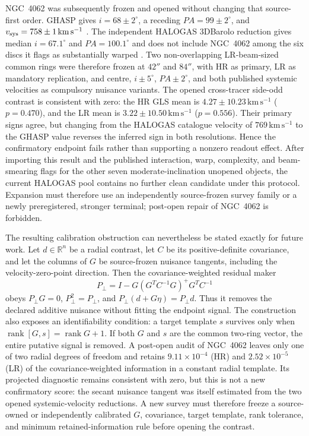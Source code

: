 \documentclass[11pt]{article}
\begin{document}
NGC~4062 was subsequently frozen and opened without changing that source-first
order. GHASP gives $i=68\pm2^\circ$, a receding
$PA=99\pm2^\circ$, and $v_{\rm sys}=758\pm1\,\mathrm{km\,s^{-1}}$
\cite{Epinat2008GHASPVI}. The independent HALOGAS 3DBarolo reduction gives
median $i=67.1^\circ$ and $PA=100.1^\circ$ and does not include NGC~4062
among the six discs it flags as substantially warped
\cite{Marasco2019HALOGASEPG}. Two non-overlapping LR-beam-sized common rings
were therefore frozen at $42''$ and $84''$, with HR as primary, LR as mandatory
replication, and centre, $i\pm5^\circ$, $PA\pm2^\circ$, and both published
systemic velocities as compulsory nuisance variants. The opened cross-tracer
side-odd contrast is consistent with zero: the HR GLS mean is
$4.27\pm10.23\,\mathrm{km\,s^{-1}}$ ($p=0.470$), and the LR mean is
$3.22\pm10.50\,\mathrm{km\,s^{-1}}$ ($p=0.556$). Their primary signs agree,
but changing from the HALOGAS catalogue velocity of $769\,\mathrm{km\,s^{-1}}$
to the GHASP value reverses the inferred sign in both resolutions. Hence the
confirmatory endpoint fails rather than supporting a nonzero readout effect.
After importing this result and the published interaction, warp, complexity,
and beam-smearing flags for the other seven moderate-inclination unopened
objects, the current HALOGAS pool contains no further clean candidate under
this protocol. Expansion must therefore use an independently source-frozen
survey family or a newly preregistered, stronger terminal; post-open repair of
NGC~4062 is forbidden.

The resulting calibration obstruction can nevertheless be stated exactly for
future work.  Let \(d\in\mathbb{R}^n\) be a radial contrast, let \(C\) be its
positive-definite covariance, and let the columns of \(G\) be source-frozen
nuisance tangents, including the velocity-zero-point direction. Then the
covariance-weighted residual maker
\[
 P_\perp=I-G(G^T C^{-1}G)^+G^T C^{-1}
\]
obeys \(P_\perp G=0\), \(P_\perp^2=P_\perp\), and
\(P_\perp(d+G\eta)=P_\perp d\). Thus it removes the declared additive
nuisance without fitting the endpoint signal. The construction also exposes
an identifiability condition: a target template \(s\) survives only when
\(\operatorname{rank}[G,s]=\operatorname{rank}G+1\). If both \(G\) and \(s\)
are the common two-ring vector, the entire putative signal is removed. A
post-open audit of NGC~4062 leaves only one of two radial degrees of freedom
and retains \(9.11\times10^{-4}\) (HR) and \(2.52\times10^{-5}\) (LR) of the
covariance-weighted information in a constant radial template. Its projected
diagnostic remains consistent with zero, but this is not a new confirmatory
score: the secant nuisance tangent was itself estimated from the two opened
systemic-velocity reductions. A new survey must therefore freeze a
source-owned or independently calibrated \(G\), covariance, target template,
rank tolerance, and minimum retained-information rule before opening the
contrast.
\end{document}
